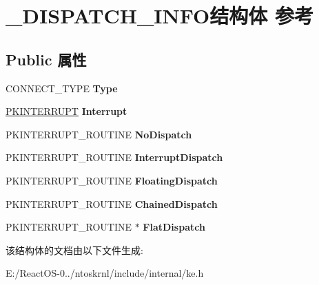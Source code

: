 \hypertarget{struct___d_i_s_p_a_t_c_h___i_n_f_o}{}\section{\+\_\+\+D\+I\+S\+P\+A\+T\+C\+H\+\_\+\+I\+N\+F\+O结构体 参考}
\label{struct___d_i_s_p_a_t_c_h___i_n_f_o}
\subsection*{Public 属性}
\begin{DoxyCompactItemize}
\item 
\mbox{\label{struct___d_i_s_p_a_t_c_h___i_n_f_o_a9df9f9ac36b2df988440a268fb783863}} 
C\+O\+N\+N\+E\+C\+T\+\_\+\+T\+Y\+PE {\bfseries Type}
\item 
\mbox{\label{struct___d_i_s_p_a_t_c_h___i_n_f_o_a220b2686b2e1a3e7a4b5186d9de6a709}} 
\hyperlink{struct___k_i_n_t_e_r_r_u_p_t}{P\+K\+I\+N\+T\+E\+R\+R\+U\+PT} {\bfseries Interrupt}
\item 
\mbox{\label{struct___d_i_s_p_a_t_c_h___i_n_f_o_ad3099712a624d6d685a4135860640689}} 
P\+K\+I\+N\+T\+E\+R\+R\+U\+P\+T\+\_\+\+R\+O\+U\+T\+I\+NE {\bfseries No\+Dispatch}
\item 
\mbox{\label{struct___d_i_s_p_a_t_c_h___i_n_f_o_abf4fdf51a43906873869a17b090a4063}} 
P\+K\+I\+N\+T\+E\+R\+R\+U\+P\+T\+\_\+\+R\+O\+U\+T\+I\+NE {\bfseries Interrupt\+Dispatch}
\item 
\mbox{\label{struct___d_i_s_p_a_t_c_h___i_n_f_o_a42de27061d0f86bf5a4b209030c20283}} 
P\+K\+I\+N\+T\+E\+R\+R\+U\+P\+T\+\_\+\+R\+O\+U\+T\+I\+NE {\bfseries Floating\+Dispatch}
\item 
\mbox{\label{struct___d_i_s_p_a_t_c_h___i_n_f_o_a0ae673c1821166b89b85995cd674a31b}} 
P\+K\+I\+N\+T\+E\+R\+R\+U\+P\+T\+\_\+\+R\+O\+U\+T\+I\+NE {\bfseries Chained\+Dispatch}
\item 
\mbox{\label{struct___d_i_s_p_a_t_c_h___i_n_f_o_a48dfdef91d1a65f8c7f192d2bace1063}} 
P\+K\+I\+N\+T\+E\+R\+R\+U\+P\+T\+\_\+\+R\+O\+U\+T\+I\+NE $\ast$ {\bfseries Flat\+Dispatch}
\end{DoxyCompactItemize}


该结构体的文档由以下文件生成\+:\begin{DoxyCompactItemize}
\item 
E\+:/\+React\+O\+S-\/0../ntoskrnl/include/internal/ke.\+h\end{DoxyCompactItemize}
